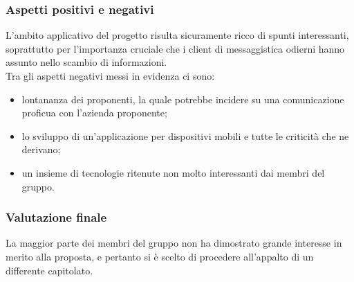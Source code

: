 		\subsubsection{Aspetti positivi e negativi}
		L'ambito applicativo del progetto risulta sicuramente ricco di spunti interessanti, soprattutto per l'importanza cruciale che i client di 
		messaggistica odierni hanno assunto nello scambio di informazioni.
		\\Tra gli aspetti negativi messi in evidenza ci sono:
		\begin{itemize}
			\item lontananza dei proponenti, la quale potrebbe incidere su una comunicazione proficua con l'azienda proponente;
			\item lo sviluppo di un'applicazione per dispositivi mobili e tutte le criticità che ne derivano;
			\item un insieme di tecnologie ritenute non molto interessanti dai membri del gruppo.
		\end{itemize}
		\subsubsection{Valutazione finale}
		La maggior parte dei membri del gruppo non ha dimostrato grande interesse in merito alla proposta, e pertanto si è scelto di procedere 
		all'appalto di un differente capitolato.

